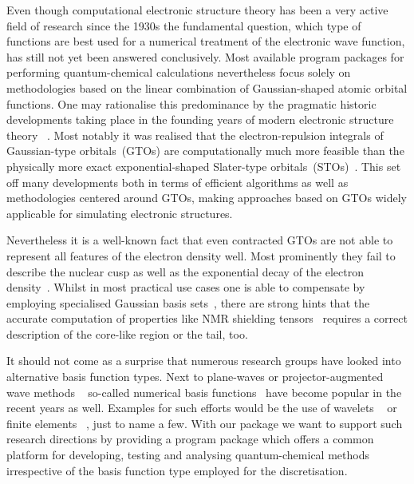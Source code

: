 Even though computational electronic structure theory
has been a very active field of research since the 1930s
the fundamental question, which type of functions
are best used for a numerical treatment of the
electronic wave function, has still not yet been answered conclusively.
Most available program packages for performing
quantum-chemical calculations nevertheless focus
solely on methodologies based on
the linear combination of Gaussian-shaped atomic orbital functions.
One may rationalise this predominance
by the pragmatic historic developments
taking place in the founding years of modern electronic structure theory%
~\cite{Boys1950, Hehre1969}.
Most notably it was realised that the electron-repulsion integrals
of Gaussian-type orbitals~(GTOs) are computationally
much more feasible than the physically more exact
exponential-shaped Slater-type orbitals~(STOs)~\cite{Slater1930}.
This set off many developments
both in terms of efficient algorithms as well as methodologies
centered around GTOs,
making approaches based on GTOs widely applicable
for simulating electronic structures.

Nevertheless it is a well-known fact
that even contracted GTOs are not able to represent
all features of the electron density well.
Most prominently they fail to describe the nuclear cusp as well as
the exponential decay of the electron density~\cite{Kato1957}.
Whilst in most practical use cases one is able to compensate
by employing specialised Gaussian basis sets~\cite{Jensen2013,Hill2013},
there are strong hints that the accurate computation of properties
like NMR shielding tensors~\cite{Guell2008,Hoggan2009}
requires a correct description of the core-like region or the tail, too.

It should not come as a surprise that numerous research groups
have looked into alternative basis function types.
Next to plane-waves or projector-augmented wave methods%
~\cite{Kresse1996,Kresse1999,Mortensen2005,Enkovaara2010}
so-called numerical basis functions~\cite{Frediani2015}
have become popular in the recent years as well.
Examples for such efforts would be the use of wavelets%
~\cite{Bischoff2011,Bischoff2012,Bischoff2013,Bischoff2014,Bischoff2014a,Bischoff2017}
or finite elements%
~\cite{Tsuchida1995,Soler2002,Lehtovaara2009,Alizadegan2010,Avery2011PhD,Davydov2015,Boffi2016},
just to name a few.
With our \molsturm package we want to support such research directions
by providing a program package
which offers a common platform for developing, testing and analysing
quantum-chemical methods irrespective of the basis function type employed for
the discretisation.

